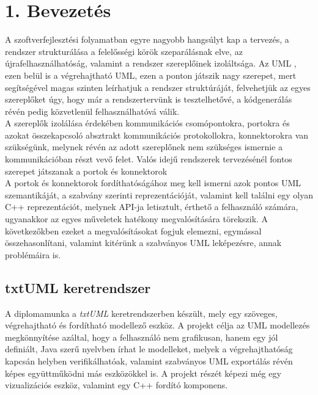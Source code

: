 \documentclass[a4paper,12pt]{report}
\begin{document}

\cleardoublepage

\tableofcontents

\chapter*{1. Bevezetés}
A szoftverfejlesztési folyamatban egyre nagyobb hangsúlyt kap a tervezés, a rendszer strukturálása a felelősségi körök szeparálásnak elve, az újrafelhasználhatóság, valamint a rendszer szereplőinek izoláltsága. Az UML \cite{uml_omg}, ezen belül is a végrehajtható UML, ezen a ponton játszik nagy szerepet, mert segítségével magas szinten leírhatjuk a rendszer struktúráját, felvehetjük az egyes szereplőket úgy, hogy már a rendszertervünk is tesztelhetővé, a kódgenerálás révén pedig közvetlenül felhasználhatóvá válik. \\ A szereplők izolálása érdekében kommunikációs csomópontokra, portokra és azokat összekapcsoló absztrakt kommunikációs protokollokra, konnektorokra van szükségünk, melynek révén az adott szereplőnek nem szükséges ismernie a kommunikációban részt vevő felet. Valós idejű rendszerek tervezésénél fontos szerepet játszanak a portok és konnektorok \cite{uml_real}\\ 
A portok és konnektorok fordíthatóságához meg kell ismerni azok pontos UML szemantikáját, a szabvány szerinti reprezentációját, valamint kell találni egy olyan C++ reprezentációt, melynek API-ja letisztult, érthető a felhasználó számára, ugyanakkor az egyes műveletek hatékony megvalósítására törekszik. A következőkben ezeket a megvalósításokat fogjuk elemezni, egymással összehasonlítani, valamint kitérünk a szabványos UML leképezésre, annak problémáira is. \\

\section{txtUML keretrendszer}
A diplomamunka a \textit{txtUML}\cite{txtuml_web} keretrendszerben készült, mely egy szöveges, végrehajtható és fordítható modellező eszköz. A projekt célja az UML modellezés megkönnyítése azáltal, hogy a felhasználó nem grafikusan, hanem egy jól definiált, Java szerű nyelvben írhat le modelleket, melyek a végrehajthatóság kapcsán helyben verifikálhatóak, valamint szabványos UML exportálás révén képes együttműködni más eszközökkel is. A projekt részét képezi még egy vizualizációs eszköz, valamint egy C++ fordító komponens.\\
\end{document}
